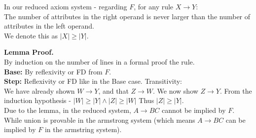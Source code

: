\begin{lemma}
	In our reduced axiom system - regarding $F$, for any rule $X\rightarrow Y$:\\
	The number of attributes in the right operand is never
	larger than the number of attributes in the left operand.\\
	We denote this as $|X|\geq |Y|$.
\end{lemma}
\textbf{Lemma Proof.}\\
By induction on the number of lines in a formal proof the rule.\\
\textbf{Base:} By reflexivity or FD from $F$.\\
\textbf{Step:} Reflexivity or FD like in the Base case.
Transitivity:\\
We have already shown $W\rightarrow Y$, and that $Z\rightarrow W$. We now show
$Z\rightarrow Y$.
From the induction hypothesis - $|W|\geq |Y| \wedge |Z|\geq |W|$ Thus $|Z|\geq|Y|$.\\

Due to the lemma, in the reduced system, $A\rightarrow BC$ cannot be implied by $F$.
While union is provable in the armstrong system (which means $A\rightarrow BC$ can be implied by $F$ in the armstring system).